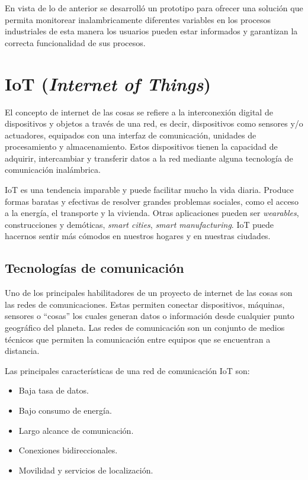 En vista de lo de anterior se desarrolló un prototipo para ofrecer una solución que permita monitorear inalambricamente diferentes variables en los procesos industriales de esta manera los usuarios pueden estar informados y garantizan la correcta funcionalidad de sus procesos.



\section{IoT (\textit{Internet of Things})}
El concepto de internet de las cosas se refiere a la interconexión digital de dispositivos y objetos  a través  de una red, es decir, dispositivos como sensores y/o actuadores, equipados con una interfaz de comunicación, unidades de procesamiento y almacenamiento\cite{centenaro2016long}. Estos dispositivos tienen la capacidad de adquirir, intercambiar y transferir datos a la red mediante alguna tecnología de comunicación inalámbrica.



IoT es una tendencia imparable y puede facilitar mucho la vida diaria. Produce formas baratas y efectivas de resolver grandes problemas sociales, como el acceso a la energía, el transporte y la vivienda. Otras aplicaciones pueden ser \textit{wearables}, construcciones y demóticas, \textit{smart cities}, \textit{smart manufacturing}\citep{taylor2015world}. IoT puede hacernos sentir más cómodos en nuestros hogares y en nuestras ciudades.

\subsection{Tecnologías de comunicación}
Uno de los principales habilitadores de un proyecto de internet de las cosas son las redes de comunicaciones. Estas permiten conectar dispositivos, máquinas, sensores o “cosas” los cuales generan datos o información desde cualquier punto geográfico del planeta. Las redes de comunicación son un conjunto de medios técnicos que permiten la comunicación entre equipos que se encuentran a distancia.

Las principales características de una red de comunicación IoT son:
\begin{itemize}
	\item Baja tasa de datos.
	\item Bajo consumo de energía.
	\item Largo alcance de comunicación.
	\item Conexiones bidireccionales.
	\item Movilidad y servicios de localización.

\end{itemize}

